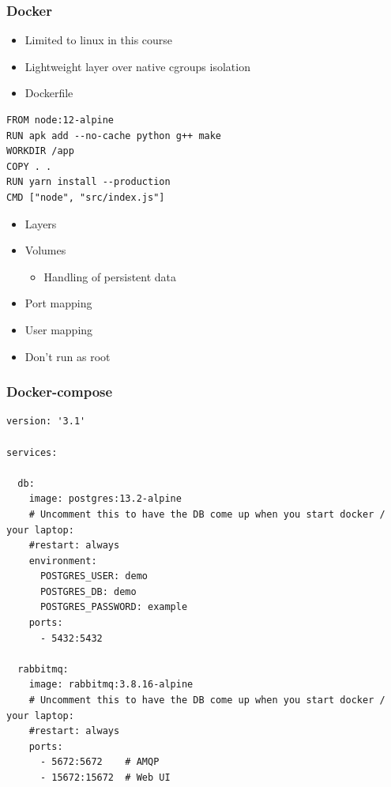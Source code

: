 \documentclass[8pt]{article}
\begin{document}
\subsubsection{Docker}
\label{sec:orgd31a985}
\begin{itemize}
\item Limited to linux in this course
\item Lightweight layer over native cgroups isolation

\item Dockerfile
\end{itemize}
\begin{verbatim}
FROM node:12-alpine
RUN apk add --no-cache python g++ make
WORKDIR /app
COPY . .
RUN yarn install --production
CMD ["node", "src/index.js"]
\end{verbatim}
\begin{itemize}
\item Layers
\item Volumes
\begin{itemize}
\item Handling of persistent data
\end{itemize}
\item Port mapping
\end{itemize}
\begin{itemize}
\item User mapping
\item Don't run as root
\end{itemize}
\subsubsection{Docker-compose}
\label{sec:org7c793ac}
\begin{verbatim}
version: '3.1'

services:

  db:
    image: postgres:13.2-alpine
    # Uncomment this to have the DB come up when you start docker / your laptop:
    #restart: always
    environment:
      POSTGRES_USER: demo
      POSTGRES_DB: demo
      POSTGRES_PASSWORD: example
    ports:
      - 5432:5432

  rabbitmq:
    image: rabbitmq:3.8.16-alpine
    # Uncomment this to have the DB come up when you start docker / your laptop:
    #restart: always
    ports:
      - 5672:5672    # AMQP
      - 15672:15672  # Web UI
\end{verbatim}
\end{document}
